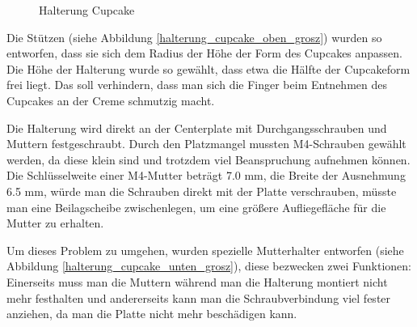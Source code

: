 			\begin{figure}[H]
			  \begin{centering}
			  \par\end{centering}
			  \caption{Halterung Cupcake}
			  \label{Halterung_Cupcake}
			\end{figure}

	Die Stützen (siehe Abbildung \ref{halterung_cupcake_oben_grosz}) wurden so entworfen, dass sie sich dem Radius \bzw der Höhe der Form des Cupcakes anpassen.
	Die Höhe der Halterung wurde so gewählt, dass etwa die Hälfte der Cupcakeform frei liegt.
	Das soll verhindern, dass man sich die Finger beim Entnehmen des Cupcakes an der Creme schmutzig macht.

	Die Halterung wird direkt an der Centerplate mit Durchgangsschrauben und Muttern festgeschraubt.
	Durch den Platzmangel mussten M4-Schrauben gewählt werden, da diese klein sind und trotzdem viel Beanspruchung aufnehmen können.
	Die Schlüsselweite einer M4-Mutter beträgt 7.0 mm, die Breite der Ausnehmung 6.5 mm, würde man die Schrauben direkt mit der Platte verschrauben, müsste man eine Beilagscheibe zwischenlegen, um eine größere Aufliegefläche für die Mutter zu erhalten.

	Um dieses Problem zu umgehen, wurden spezielle Mutterhalter entworfen (siehe Abbildung \ref{halterung_cupcake_unten_grosz}), diese bezwecken zwei Funktionen:
	Einerseits muss man die Muttern während man die Halterung montiert nicht mehr festhalten und andererseits kann man die Schraubverbindung viel fester anziehen, da man die Platte nicht mehr beschädigen kann.

